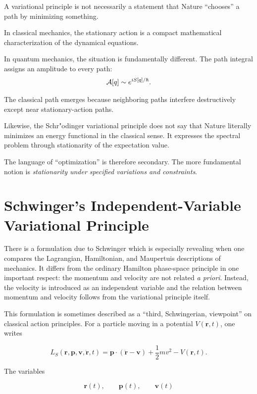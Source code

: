 A variational principle is not necessarily a statement that Nature ``chooses'' a path by minimizing something.

In classical mechanics, the stationary action is a compact mathematical characterization of the dynamical equations.

In quantum mechanics, the situation is fundamentally different.  The path integral assigns an amplitude to every path:
\begin{equation}
{\cal A}[q]
\sim
e^{iS[q]/\hbar}.
\end{equation}

The classical path emerges because neighboring paths interfere destructively except near stationary-action paths.

Likewise, the Schr"odinger variational principle does not say that Nature literally minimizes an energy functional in the classical sense.  It expresses the spectral problem through stationarity of the expectation value.

The language of ``optimization'' is therefore secondary.  The more fundamental notion is \emph{stationarity under specified variations and constraints}.

\section{Schwinger's Independent-Variable Variational Principle}

There is a formulation due to Schwinger which is especially revealing when one compares the Lagrangian, Hamiltonian, and Maupertuis descriptions of mechanics. It differs from the ordinary Hamilton phase-space principle in one important respect: the momentum and velocity are not related \emph{a priori}. Instead, the velocity is introduced as an independent variable and the relation between momentum and velocity follows from the variational principle itself.

This formulation is sometimes described as a ``third, Schwingerian, viewpoint'' on classical action principles. For a particle moving in a potential \(V(\mathbf r,t)\), one writes

\begin{equation}
L_S(\mathbf r,\mathbf p,\mathbf v,\dot{\mathbf r},t)=
\mathbf p\cdot(\dot{\mathbf r}-\mathbf v)
+\frac12m v^2
-V(\mathbf r,t).
\label{eq:SchwingerExtendedL}
\end{equation}

The variables

$$
\mathbf r(t),\qquad
\mathbf p(t),\qquad
\mathbf v(t)
$$

